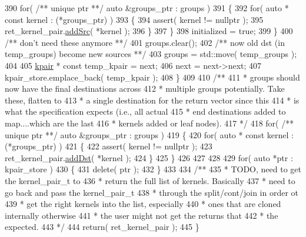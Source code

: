 \begin{DoxyCode}
390             \textcolor{keywordflow}{for}( \textcolor{comment}{/** unique ptr **/} \textcolor{keyword}{auto} &groups\_ptr : groups )
391             \{
392                 \textcolor{keywordflow}{for}( \textcolor{keyword}{auto} * \textcolor{keyword}{const} kernel : (*groups\_ptr) )
393                 \{
394                     assert( kernel != \textcolor{keyword}{nullptr} );
395                     ret\_kernel\_pair.\hyperlink{classkernel__pair__t_a73351e6699a9243b48df6492f12c83ad}{addSrc}( *kernel );
396                 \}
397             \}
398             initialized = \textcolor{keyword}{true};
399         \}\textcolor{comment}{}
400 \textcolor{comment}{        /** don't need these anymore **/}
401         groups.clear();\textcolor{comment}{}
402 \textcolor{comment}{        /** now old dst (in temp\_groups) become new sources **/}
403         groups = std::move( temp\_groups );
404         
405         \hyperlink{classkpair}{kpair} * \textcolor{keyword}{const} temp\_kpair = next;
406         next = next->next;
407         kpair\_store.emplace\_back( temp\_kpair );
408     \}
409     \textcolor{comment}{}
410 \textcolor{comment}{    /** }
411 \textcolor{comment}{     * groups should now have the final destinations across}
412 \textcolor{comment}{     * multiple groups potentially. Take these, flatten to}
413 \textcolor{comment}{     * a single destination for the return vector since this}
414 \textcolor{comment}{     * is what the specification expects (i.e., all actual}
415 \textcolor{comment}{     * end destinations added to map....which are the last}
416 \textcolor{comment}{     * kernels added or leaf nodes).}
417 \textcolor{comment}{     */}
418     \textcolor{keywordflow}{for}( \textcolor{comment}{/** unique ptr **/} \textcolor{keyword}{auto} &groups\_ptr : groups )
419     \{
420         \textcolor{keywordflow}{for}( \textcolor{keyword}{auto} * \textcolor{keyword}{const} kernel : (*groups\_ptr) )
421         \{
422             assert( kernel != \textcolor{keyword}{nullptr} );
423             ret\_kernel\_pair.\hyperlink{classkernel__pair__t_ae22da5b3353d0ccc24d88f87506f5ed4}{addDst}( *kernel );
424         \}
425     \}
426     
427     
428     
429     \textcolor{keywordflow}{for}( \textcolor{keyword}{auto} *ptr : kpair\_store )
430     \{
431         \textcolor{keyword}{delete}( ptr );
432     \}
433 \textcolor{comment}{}
434 \textcolor{comment}{    /**}
435 \textcolor{comment}{     * TODO, need to get the kernel\_pair\_t to }
436 \textcolor{comment}{     * return the full list of kernels. Basically}
437 \textcolor{comment}{     * need to go back and pass the kernel\_pair\_t}
438 \textcolor{comment}{     * through the split/cont/join in order ot }
439 \textcolor{comment}{     * get the right kernels into the list, especially}
440 \textcolor{comment}{     * ones that are cloned internally otherwise}
441 \textcolor{comment}{     * the user might not get the returns that}
442 \textcolor{comment}{     * the expected.}
443 \textcolor{comment}{     */}
444     \textcolor{keywordflow}{return}( ret\_kernel\_pair );
445 \}
\end{DoxyCode}
